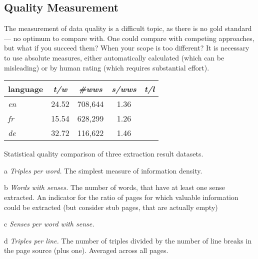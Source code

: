 \subsection{Quality Measurement}
The measurement of data quality is a difficult topic, as there is no gold standard --- no optimum to compare with. 
One could compare with competing approaches, but what if you succeed them? 
When your scope is too different? 
It is necessary to use absolute measures, either automatically calculated (which can be misleading) or by human rating (which requires substantial effort).

\begin{threeparttable} 
\begin{tabular}{|l|c|c|c|c|}
\hline language & \emph{t/w}\tnote{a}\hspace{0.15cm} & \emph{\#wws}\tnote{b}\hspace{0.15cm} & \emph{s/wws}\tnote{c}\hspace{0.15cm} & \emph{t/l}\tnote{d}\hspace{0.15cm} \\
\hline \hline \textit{en} & 24.52 & 708,644 & 1.36 & \\
\hline \textit{fr} & 15.54 & 628,299 & 1.26 & \\ 
\hline \textit{de} & 32.72 & 116,622 & 1.46 & \\ 
\hline 
\end{tabular} 
\caption{Statistical quality comparison of three \wik extraction result datasets.}
\begin{tablenotes}\footnotesize 
\item[a] \textit{Triples per word.} The simplest measure of information density.
\item[b] \textit{Words with senses.} The number of words, that have at least one sense  extracted. 
An indicator for the ratio of pages for which valuable information could be extracted (but consider stub pages, that are actually empty)
\item[c] \textit{Senses per word with sense.} 
\item[d] \textit{Triples per line.} The number of triples divided by the number of line breaks in the page source (plus one). 
Averaged across all pages.
\end{tablenotes}
\end{threeparttable}

